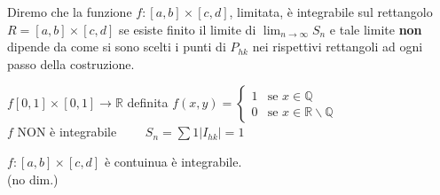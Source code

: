 \documentclass[a4paper, oneside]{article}
\begin{document}
\begin{definition}
    Diremo che la funzione $f:[a,b] \times [c,d]$, 
    limitata, è integrabile sul rettangolo $R=[a,b] \times 
    [c,d]$ se esiste finito il limite di  $\lim_{n \to \infty}S_n$ e 
     tale limite \textbf{non} dipende da come si sono scelti 
    i punti di $P_{hk}$ nei rispettivi rettangoli ad ogni passo della costruzione. 
\end{definition}

\begin{example}
    $f[0,1]\times[0,1] \to \mathbb{R}$ definita $f(x,y) =   \begin{cases}
        1 & \text{se } x \in \mathbb{Q} \\
        0 & \text{se } x \in \mathbb{R}\backslash\mathbb{Q}
    \end{cases} $\\
    $f$ NON è integrabile $\qquad S_n = \sum 1 |I_{hk}| = 1$\\
\end{example}


\begin{theorem}
     $f:[a,b] \times [c,d]$ è contuinua
     è integrabile.\\
    (no dim.)
\end{theorem}
\end{document}
